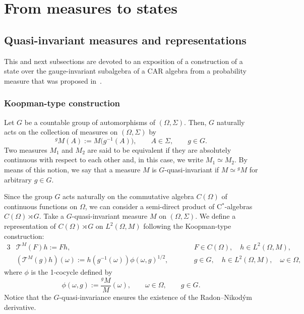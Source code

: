 \documentclass[pdftex]{sigma}
\numberwithin{equation}{section}
\newcommand{\mcal}[1]{\mathcal{#1}}
\begin{document}
\section{From measures to states}\label{sect:measre_to_state}
\subsection{Quasi-invariant measures and representations}
This and next subsections are devoted to an exposition of a construction of a state over the gauge-invariant subalgebra of a CAR algebra from a probability measure that was proposed in~\cite{Olshanski2020}.
\subsubsection{Koopman-type construction}
Let $G$ be a countable group of automorphisms of $(\Omega,\Sigma)$. Then, $G$ naturally acts on the collection of measures on $(\Omega,\Sigma)$ by
\begin{equation*}
	{}^{g}M(A):=M\big(g^{-1}(A)\big),\qquad A\in \Sigma,\qquad g\in G.
\end{equation*}
Two measures $M_{1}$ and $M_{2}$ are said to be equivalent if they are absolutely continuous with respect to each other and, in this case, we write $M_{1}\simeq M_{2}$. By means of this notion, we say that a measure $M$ is $G$-quasi-invariant if $M\simeq {}^{g}M$ for arbitrary $g\in G$.

Since the group $G$ acts naturally on the commutative algebra $C(\Omega)$ of continuous functions on $\Omega$, we can consider a semi-direct product of C$^{\ast}$-algebras $C(\Omega)\rtimes G$. Take a $G$-quasi-invariant measure $M$ on $(\Omega,\Sigma)$.
We define a representation of $C(\Omega)\rtimes G$ on $L^{2}(\Omega,M)$ following the Koopman-type construction:
\begin{alignat*}{3}
	&\mcal{T}^{M}(F)h:=Fh, \qquad && F\in C(\Omega),\quad h\in L^{2}(\Omega, M),& \\
	&(\mcal{T}^{M}(g)h)(\omega):=h(g^{-1}(\omega))\phi (\omega,g )^{1/2}, \qquad && g\in G,\quad h\in L^{2}(\Omega,M),\quad \omega\in \Omega,&
\end{alignat*}
where $\phi$ is the 1-cocycle defined by
\begin{equation*}
	\phi (\omega,g):=\frac{{}^{g}M}{M}(\omega),\qquad \omega\in \Omega,\qquad g\in G.
\end{equation*}
Notice that the $G$-quasi-invariance ensures the existence of the Radon--Nikod{\'y}m derivative.
\end{document}
